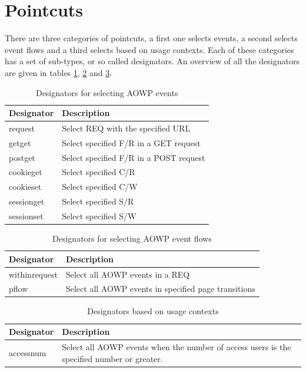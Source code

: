 \documentclass[a4paper]{report}
\begin{document}
\section{Pointcuts}
There are three categories of pointcuts, a first one selects events, a second selects event flows and a third selects based on usage contexts. Each of these categories has a set of sub-types, or so called designators. An overview of all the designators are given in tables \ref{tab:Designators_AOWP_Events}, \ref{tab:Designators_AOWP_Flows} and \ref{tab:Designators_AOWP_Contexts}.
\begin{table}
\centering
\begin{tabular}{l|p{7cm}}
\hline
Designator & Description\\
\hline
\hline
request & Select REQ with the specified URL\\
\hline
getget & Select specified F/R in a GET request\\
\hline
postget & Select specified F/R in a POST request\\
\hline
cookieget & Select specified C/R\\
\hline
cookieset & Select specified C/W\\
\hline
sessionget & Select specified S/R\\
\hline
sessionset & Select specified S/W\\
\hline
\end{tabular}
\caption{Designators for selecting AOWP events}
\label{tab:Designators_AOWP_Events}
\end{table}
\begin{table}
\centering
\begin{tabular}{l|p{7cm}}
\hline
Designator & Description\\
\hline
\hline
withinrequest & Select all AOWP events in a REQ\\
\hline
pflow & Select all AOWP events in specified page transitions\\
\hline
\end{tabular}
\caption{Designators for selecting AOWP event flows}
\label{tab:Designators_AOWP_Flows}
\end{table}
\begin{table}
\centering
\begin{tabular}{l|p{7cm}}
\hline
Designator & Description\\
\hline
\hline
accessnum & Select all AOWP events when the number of access users is the specified number or greater.\\
\hline
\end{tabular}
\caption{Designators based on usage contexts}
\label{tab:Designators_AOWP_Contexts}
\end{table}
\end{document}
